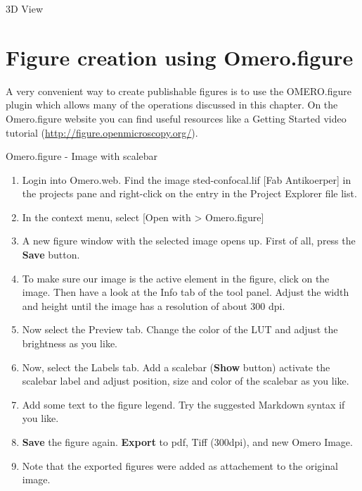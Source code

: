 \begin{taskbox}{3D View}
\end{taskbox}


\section{Figure creation using Omero.figure}
A very convenient way to create publishable figures is to use the
OMERO.figure plugin which allows many of the operations discussed in
this chapter. On the Omero.figure website you can find useful resources like a Getting Started video tutorial (\url{http://figure.openmicroscopy.org/}).

\begin{taskbox}{Omero.figure - Image with scalebar}
  \begin{enumerate}
    \item Login into Omero.web. Find the image sted-confocal.lif [Fab
    Antikoerper] in the projects pane and right-click on the entry in
    the Project Explorer file list.
    \item In the context menu, select [Open with > Omero.figure]
    \item A new figure window with the selected image opens up. First of
    all, press the \textbf{Save} button.
    \item To make sure our image is the active element in the figure,
    click on the image. Then have a look at the Info tab of the
    tool panel. Adjust the width and height until the image has a
    resolution of about 300 dpi.
    \item Now select the Preview tab. Change the color of the LUT and
    adjust the brightness as you like.
    \item Now, select the Labels tab. Add a scalebar (\textbf{Show} button)
    activate the scalebar label and adjust position, size and color of the
    scalebar as you like.
    \item Add some text to the figure legend. Try the suggested Markdown
    syntax if you like.        
    \item \textbf{Save} the figure again. \textbf{Export} to pdf, Tiff (300dpi), and
    new Omero Image.
    \item Note that the exported figures were added as
    attachement to the original image.
  \end{enumerate}
\end{taskbox}


